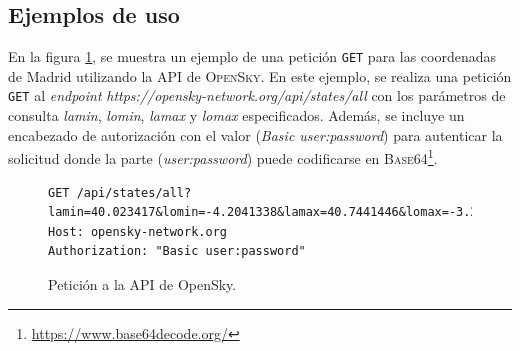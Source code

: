 \documentclass[a4paper, 11pt]{book}
\begin{document}
\subsection{Ejemplos de uso}
En la figura \ref{fig:getOpensky}, se muestra un ejemplo de una petición \texttt{GET} para las coordenadas de Madrid utilizando la \gls{API} de \textsc{OpenSky}.
En este ejemplo, se realiza una petición \texttt{GET} al \emph{endpoint} \emph{https://opensky-network.org/api/states/all} con los parámetros de consulta \emph{lamin}, \emph{lomin}, \emph{lamax} y \emph{lomax} especificados. Además, se incluye un encabezado de autorización con el valor (\emph{Basic user:password}) para autenticar la solicitud donde la parte (\emph{user:password}) puede codificarse en \textsc{Base64}\footnote{\url{https://www.base64decode.org/}}.
\begin{figure}[h]
	\centering
	\begin{verbatim}
GET /api/states/all?lamin=40.023417&lomin=-4.2041338&lamax=40.7441446&lomax=-3.2538165
Host: opensky-network.org
Authorization: "Basic user:password"
	\end{verbatim}
	\caption{Petición a la API de OpenSky.}
	\label{fig:getOpensky}
\end{figure}
\end{document}
